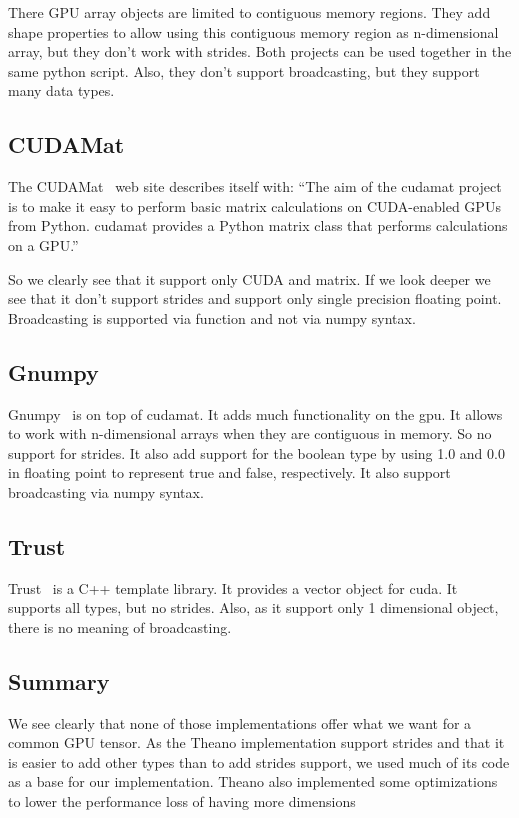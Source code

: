 \documentclass{article} %
\begin{document}
There GPU array objects are limited to contiguous memory regions. They add shape properties to allow using this contiguous memory region as n-dimensional array, but they don't work with strides. Both projects can be used together in the same python script. Also, they don't support broadcasting, but they support many data types.

\subsection{CUDAMat}
The CUDAMat~\citep{cudamat-TR2009} web site describes itself with: ``The aim of the cudamat project is to make it easy to perform basic matrix calculations on CUDA-enabled GPUs from Python. cudamat provides a Python matrix class that performs calculations on a GPU.''

So we clearly see that it support only CUDA and matrix. If we look deeper we see that it don't support strides and support only single precision floating point. Broadcasting is supported via function and not via numpy syntax.

\subsection{Gnumpy}
Gnumpy~\citep{gnumpy-TR2010} is on top of cudamat. It adds much functionality on the gpu. It allows to work with n-dimensional arrays when they are contiguous in memory. So no support for strides. It also add support for the boolean type by using 1.0 and 0.0 in floating point to represent true and false, respectively. It also support broadcasting via numpy syntax.

\subsection{Trust}
Trust~\citep{Thrust} is a C++ template library. It provides a vector object for cuda. It supports all types, but no strides. Also, as it support only 1 dimensional object, there is no meaning of broadcasting.

\subsection{Summary}
We see clearly that none of those implementations offer what we want for a common GPU tensor. As the Theano implementation support strides and that it is easier to add other types than to add strides support, we used much of its code as a base for our implementation. Theano also implemented some optimizations to lower the performance loss of having more dimensions
\end{document}
